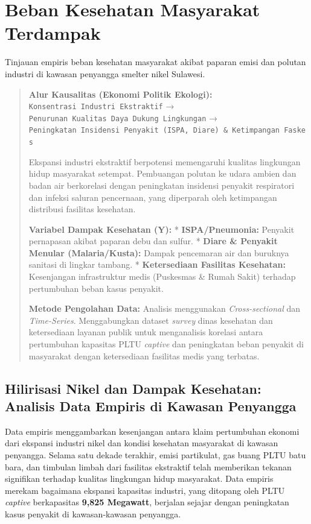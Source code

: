 \documentclass[
]{article}
\author{}
\date{}
\begin{document}
\section{Beban Kesehatan Masyarakat
Terdampak}\label{beban-kesehatan-masyarakat-terdampak}

Tinjauan empiris beban kesehatan masyarakat akibat paparan emisi dan
polutan industri di kawasan penyangga smelter nikel Sulawesi.

\begin{quote}
\textbf{Alur Kausalitas (Ekonomi Politik Ekologi):}
\texttt{Konsentrasi\ Industri\ Ekstraktif} →
\texttt{Penurunan\ Kualitas\ Daya\ Dukung\ Lingkungan} →
\texttt{Peningkatan\ Insidensi\ Penyakit\ (ISPA,\ Diare)\ \&\ Ketimpangan\ Faskes}

Ekspansi industri ekstraktif berpotensi memengaruhi kualitas lingkungan
hidup masyarakat setempat. Pembuangan polutan ke udara ambien dan badan
air berkorelasi dengan peningkatan insidensi penyakit respiratori dan
infeksi saluran pencernaan, yang diperparah oleh ketimpangan distribusi
fasilitas kesehatan.

\textbf{Variabel Dampak Kesehatan (Y):} * \textbf{ISPA/Pneumonia:}
Penyakit pernapasan akibat paparan debu dan sulfur. * \textbf{Diare \&
Penyakit Menular (Malaria/Kusta):} Dampak pencemaran air dan buruknya
sanitasi di lingkar tambang. * \textbf{Ketersediaan Fasilitas
Kesehatan:} Kesenjangan infrastruktur medis (Puskesmas \& Rumah Sakit)
terhadap pertumbuhan beban kasus penyakit.

\textbf{Metode Pengolahan Data:} Analisis menggunakan
\emph{Cross-sectional} dan \emph{Time-Series}. Menggabungkan dataset
\emph{survey} dinas kesehatan dan ketersediaan layanan publik untuk
menganalisis korelasi antara pertumbuhan kapasitas PLTU \emph{captive}
dan peningkatan beban penyakit di masyarakat dengan ketersediaan
fasilitas medis yang terbatas.
\end{quote}

\subsection{Hilirisasi Nikel dan Dampak Kesehatan: Analisis Data Empiris
di Kawasan
Penyangga}\label{hilirisasi-nikel-dan-dampak-kesehatan-analisis-data-empiris-di-kawasan-penyangga}

Data empiris menggambarkan kesenjangan antara klaim pertumbuhan ekonomi
dari ekspansi industri nikel dan kondisi kesehatan masyarakat di kawasan
penyangga. Selama satu dekade terakhir, emisi partikulat, gas buang PLTU
batu bara, dan timbulan limbah dari fasilitas ekstraktif telah
memberikan tekanan signifikan terhadap kualitas lingkungan hidup
masyarakat. Data empiris merekam bagaimana ekspansi kapasitas industri,
yang ditopang oleh PLTU \emph{captive} berkapasitas \textbf{9,825
Megawatt}, berjalan sejajar dengan peningkatan kasus penyakit di
kawasan-kawasan penyangga.
\end{document}
